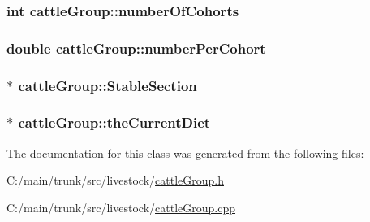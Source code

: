 \label{classcattle_group_aa1b9dd62ca0a63632fd7ae743c893b09}
\hypertarget{classcattle_group_a5cd24310ad3a445124c635e5ba4e3664}{
\subsubsection[{numberOfCohorts}]{\setlength{\rightskip}{0pt plus 5cm}int {\bf cattleGroup::numberOfCohorts}}}
\label{classcattle_group_a5cd24310ad3a445124c635e5ba4e3664}
\hypertarget{classcattle_group_a33953aa20c4d369b4ea2d34aadfa7611}{
\subsubsection[{numberPerCohort}]{\setlength{\rightskip}{0pt plus 5cm}double {\bf cattleGroup::numberPerCohort}}}
\label{classcattle_group_a33953aa20c4d369b4ea2d34aadfa7611}
\hypertarget{classcattle_group_a5af469b87a56a3051f06d3318266cc34}{
\subsubsection[{StableSection}]{$\ast$ {\bf cattleGroup::StableSection}}}
\label{classcattle_group_a5af469b87a56a3051f06d3318266cc34}
\hypertarget{classcattle_group_ae11a48f54c12141636ea3bb1a47481ee}{
\subsubsection[{theCurrentDiet}]{$\ast$ {\bf cattleGroup::theCurrentDiet}}}
\label{classcattle_group_ae11a48f54c12141636ea3bb1a47481ee}


The documentation for this class was generated from the following files:\begin{DoxyCompactItemize}
\item 
C:/main/trunk/src/livestock/\hyperlink{cattle_group_8h}{cattleGroup.h}\item 
C:/main/trunk/src/livestock/\hyperlink{cattle_group_8cpp}{cattleGroup.cpp}\end{DoxyCompactItemize}
